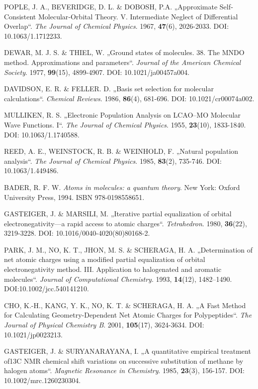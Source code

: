 \begin{thebibliography}{10}
POPLE, J. A., BEVERIDGE, D. L. \& DOBOSH, P.A. „Approximate Self‐Consistent Molecular‐Orbital Theory. V. Intermediate Neglect of Differential Overlap“. \textit{The Journal of Chemical Physics}. 1967, \textbf{47}(6), 2026-2033. DOI: 10.1063/1.1712233.

DEWAR, M. J. S. \& THIEL, W. „Ground states of molecules. 38. The MNDO method. Approximations and parameters“. \textit{Journal of the American Chemical Society}. 1977, \textbf{99}(15), 4899-4907. DOI: 10.1021/ja00457a004.

DAVIDSON, E. R. \& FELLER. D. „Basis set selection for molecular calculations“. \textit{Chemical Reviews}. 1986, \textbf{86}(4), 681-696. DOI: 10.1021/cr00074a002. 

MULLIKEN, R. S. „Electronic Population Analysis on LCAO–MO Molecular Wave Functions. I“. \textit{The Journal of Chemical Physics}. 1955, \textbf{23}(10), 1833-1840. DOI: 10.1063/1.1740588. 

REED, A. E., WEINSTOCK, R. B. \& WEINHOLD, F. „Natural population analysis“. \textit{The Journal of Chemical Physics}. 1985, \textbf{83}(2), 735-746. DOI: 10.1063/1.449486.

BADER, R. F. W. \textit{Atoms in molecules: a quantum theory}. New York: Oxford University Press, 1994. ISBN 978-0198558651.

GASTEIGER, J. \& MARSILI, M. „Iterative partial equalization of orbital electronegativity—a rapid access to atomic charges“. \textit{Tetrahedron}. 1980, \textbf{36}(22), 3219-3228. DOI: 10.1016/0040-4020(80)80168-2.

PARK, J. M., NO, K. T., JHON, M. S. \& SCHERAGA, H. A. „Determination of net atomic charges using a modified partial equalization of orbital electronegativity method. III. Application to halogenated and aromatic molecules“. \textit{Journal of Computational Chemistry}. 1993, \textbf{14}(12), 1482–1490. DOI:10.1002/jcc.540141210.

CHO, K.-H., KANG, Y. K., NO, K. T. \& SCHERAGA, H. A. „A Fast Method for Calculating Geometry-Dependent Net Atomic Charges for Polypeptides“. \textit{The Journal of Physical Chemistry B}. 2001, \textbf{105}(17), 3624-3634. DOI: 10.1021/jp0023213.

GASTEIGER, J. \& SURYANARAYANA, I. „A quantitative empirical treatment of13C NMR chemical shift variations on successive substitution of methane by halogen atoms“. \textit{Magnetic Resonance in Chemistry}. 1985, \textbf{23}(3), 156-157. DOI: 10.1002/mrc.1260230304. 


\end{thebibliography}
